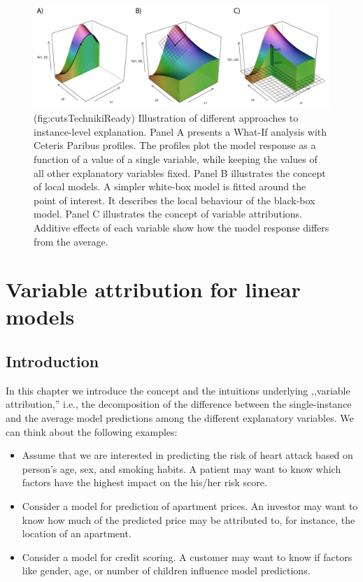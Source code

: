 \documentclass[]{krantz}
\providecommand{\tightlist}{%
  \setlength{\itemsep}{0pt}\setlength{\parskip}{0pt}}
\theoremstyle{definition}
\theoremstyle{definition}
\theoremstyle{definition}
\theoremstyle{remark}
\begin{document}
\begin{figure}

{\centering \includegraphics[width=0.99\linewidth]{figure/cuts_techniki_ready} 

}

\caption{(fig:cutsTechnikiReady) Illustration of different approaches to instance-level explanation. Panel A presents a What-If analysis with Ceteris Paribus profiles. The profiles plot the model response as a function of a value of a single variable, while keeping the values of all other explanatory variables fixed. Panel B illustrates the concept of local models. A simpler white-box model is fitted around the point of interest. It describes the local behaviour of the black-box model. Panel C illustrates the concept of variable attributions. Additive effects of each variable show how the model response differs from the average.}\label{fig:cutsTechnikiReady}
\end{figure}

\hypertarget{variableAttributionMethods}{%
\section{Variable attribution for linear
models}\label{variableAttributionMethods}}

\hypertarget{introduction-1}{%
\subsection{Introduction}\label{introduction-1}}

In this chapter we introduce the concept and the intuitions underlying
,,variable attribution,'' i.e., the decomposition of the difference
between the single-instance and the average model predictions among the
different explanatory variables. We can think about the following
examples:

\begin{itemize}
\tightlist
\item
  Assume that we are interested in predicting the risk of heart attack
  based on person's age, sex, and smoking habits. A patient may want to
  know which factors have the highest impact on the his/her risk score.
\item
  Consider a model for prediction of apartment prices. An investor may
  want to know how much of the predicted price may be attributed to, for
  instance, the location of an apartment.
\item
  Consider a model for credit scoring. A customer may want to know if
  factors like gender, age, or number of children influence model
  predictions.
\end{itemize}
\end{document}
